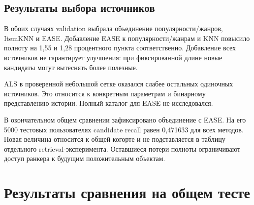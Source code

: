 \documentclass[12pt,a4paper]{article}
\begin{document}
\subsection{Результаты выбора источников}
В обоих случаях validation выбрала объединение популярности/жанров,
ItemKNN и EASE. Добавление EASE к популярности/жанрам и KNN повысило
полноту на 1,55 и 1,28 процентного пункта соответственно. Добавление всех
источников не гарантирует улучшения: при фиксированной длине новые
кандидаты могут вытеснять более полезные.

ALS в проверенной небольшой сетке оказался слабее остальных одиночных
источников. Это относится к конкретным параметрам и бинарному представлению
истории. Полный каталог для EASE не исследовался.

В окончательном общем сравнении зафиксировано объединение с EASE.
На его 5000 тестовых пользователях candidate recall равен 0,471633 для
всех методов. Новая величина относится к общей когорте и не подставляется
в таблицу отдельного retrieval-эксперимента. Оставшиеся потери полноты
ограничивают доступ ранкера к будущим положительным объектам.

\section{Результаты сравнения на общем тесте}
\end{document}
